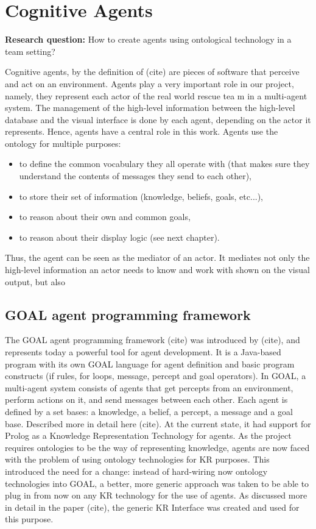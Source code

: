 \chapter{Cognitive Agents}

\textbf{Research question:} How to create agents using ontological technology in a team setting?

Cognitive agents, by the definition of (cite) are pieces of software that perceive and act on an environment. Agents play a very important role in our project, namely, they represent each actor of the real world rescue tea m in a multi-agent system. The management of the high-level information between the high-level database and the visual interface is done by each agent, depending on the actor it represents. Hence, agents have a central role in this work. Agents use the ontology for multiple purposes: 
\begin{itemize}
\item to define the common vocabulary they all operate with (that makes sure they understand the contents of messages they send to each other),
\item to store their set of information (knowledge, beliefs, goals, etc...), 
\item to reason about their own and common goals,
\item to reason about their display logic (see next chapter).
\end{itemize} 
Thus, the agent can be seen as the mediator of an actor. It mediates not only the high-level information an actor needs to know and work with shown on the visual output, but also 


\section{GOAL agent programming framework}

The GOAL agent programming framework (cite) was introduced by (cite), and represents today a powerful tool for agent development. It is a Java-based program with its own GOAL language for agent definition and basic program constructs (if rules, for loops, message, percept and goal operators). 
In GOAL, a multi-agent system consists of agents that get percepts from an environment, perform actions on it, and send messages between each other. Each agent is defined by a set bases: a knowledge, a belief, a percept, a message and a goal base. Described more in detail here (cite).
At the current state, it had support for Prolog as a Knowledge Representation Technology for agents. 
As the project requires ontologies to be the way of representing knowledge, agents are now faced with the problem of using ontology technologies for KR purposes. This introduced the need for a change: instead of hard-wiring now ontology technologies into GOAL, a better, more generic approach was taken to be able to plug in from now on any KR technology for the use of agents. As discussed more in detail in the paper (cite), the generic KR Interface was created and used for this purpose.

